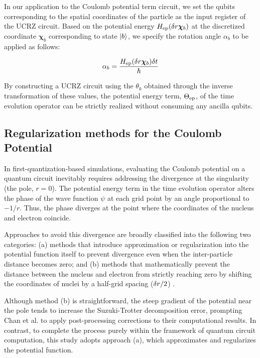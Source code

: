 \documentclass[jctc-draft.tex]{subfiles}
\begin{document}
In our application to the Coulomb potential term circuit, we set the qubits
corresponding to the spatial coordinates of the particle as the input register
of the UCRZ circuit. Based on the potential energy $H_{\mathrm{ep}}(\delta r\bm{\chi}_b)$ at
the discretized coordinate $\bm{\chi}_b$ corresponding to state $\ket{b}$, we
specify the rotation angle $\alpha_b$ to be applied as follows:

\begin{equation}
\alpha_b = \frac{H_{\mathrm{ep}}(\delta r\bm{\chi}_b)\delta t}{\hbar}
\end{equation}

By constructing a UCRZ circuit using the $\theta_k$ obtained through the inverse
transformation of these values, the potential energy term, $\Theta_{\mathrm{ep}}$, of the
time evolution operator can be strictly realized without consuming any ancilla
qubits.

\subsection{Regularization methods for the Coulomb Potential}
\label{subsec:coulomb-potential-handling}
In first-quantization-based simulations, evaluating the Coulomb potential on a
quantum circuit inevitably requires addressing the divergence at the singularity
(the pole, $r=0$). The potential energy term in the time evolution operator
alters the phase of the wave function $\psi$ at each grid point by an angle
proportional to $-1/r$. Thus, the phase diverges at the point where the
coordinates of the nucleus and electron coincide.

Approaches to avoid this divergence are broadly classified into the following
two categories: (a) methods that introduce approximation or regularization into
the potential function itself to prevent divergence even when the inter-particle
distance becomes zero; and (b) methods that mathematically prevent the distance
between the nucleus and electron from strictly reaching zero by shifting the
coordinates of nuclei by a half-grid spacing ($\delta r/2$)
\cite{Chan2023.sciadv.abo7484}.

Although method (b) is straightforward, the steep gradient of the potential near
the pole tends to increase the Suzuki-Trotter decomposition error, prompting
Chan et al. to apply post-processing corrections to their computational results.
In contrast, to complete the process purely within the framework of quantum
circuit computation, this study adopts approach (a), which approximates and
regularizes the potential function.
\end{document}
